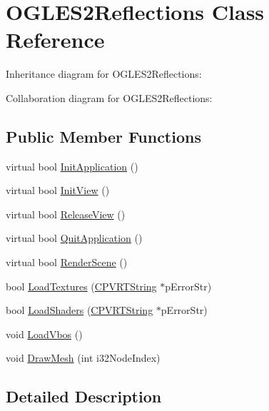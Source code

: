 \hypertarget{class_o_g_l_e_s2_reflections}{\section{O\+G\+L\+E\+S2\+Reflections Class Reference}
\label{class_o_g_l_e_s2_reflections}
}


Inheritance diagram for O\+G\+L\+E\+S2\+Reflections\+:


Collaboration diagram for O\+G\+L\+E\+S2\+Reflections\+:
\subsection*{Public Member Functions}
\begin{DoxyCompactItemize}
\item 
virtual bool \hyperlink{class_o_g_l_e_s2_reflections_af1a36c06b2bd1e136d000d43cb4f7ccf}{Init\+Application} ()
\item 
virtual bool \hyperlink{class_o_g_l_e_s2_reflections_a2edde4ea3f5fb9e19f235ce1a4504382}{Init\+View} ()
\item 
virtual bool \hyperlink{class_o_g_l_e_s2_reflections_ac19a89ddb223ba6ef5b8de46f24c785c}{Release\+View} ()
\item 
virtual bool \hyperlink{class_o_g_l_e_s2_reflections_ad6c0d9c673af70610ff6b8506d4d9a1c}{Quit\+Application} ()
\item 
virtual bool \hyperlink{class_o_g_l_e_s2_reflections_abd8a8346e843c09acd9ae7f011b487be}{Render\+Scene} ()
\item 
bool \hyperlink{class_o_g_l_e_s2_reflections_aabf9eca2a4f02622811af3b0e2b2bd4d}{Load\+Textures} (\hyperlink{class_c_p_v_r_t_string}{C\+P\+V\+R\+T\+String} $\ast$p\+Error\+Str)
\item 
bool \hyperlink{class_o_g_l_e_s2_reflections_a6824ba3e1b592f375e6d2f1a783f6805}{Load\+Shaders} (\hyperlink{class_c_p_v_r_t_string}{C\+P\+V\+R\+T\+String} $\ast$p\+Error\+Str)
\item 
void \hyperlink{class_o_g_l_e_s2_reflections_ab87e0daa48f5671a7c191a2a4e3885b2}{Load\+Vbos} ()
\item 
void \hyperlink{class_o_g_l_e_s2_reflections_aabdf95fe97f787314127fb4051a4bf5b}{Draw\+Mesh} (int i32\+Node\+Index)
\end{DoxyCompactItemize}


\subsection{Detailed Description}


